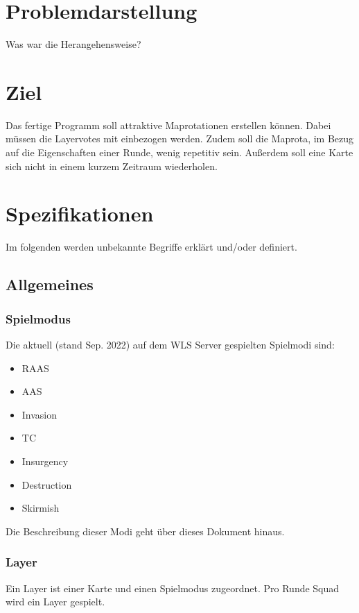 \documentclass[a4paper, 11pt]{scrartcl}
\begin{document}
    \section{Problemdarstellung}
        Was war die Herangehensweise?

    \section{Ziel}
        Das fertige Programm soll attraktive Maprotationen erstellen können.
        Dabei müssen die Layervotes mit einbezogen werden. Zudem soll die Maprota, im Bezug auf die Eigenschaften einer Runde, wenig repetitiv sein.
        Außerdem soll eine Karte sich nicht in einem kurzem Zeitraum wiederholen.

    \section{Spezifikationen}
    Im folgenden werden unbekannte Begriffe erklärt und/oder definiert.
        \subsection{Allgemeines}
            \subsubsection{Spielmodus}
                Die aktuell (stand Sep. 2022) auf dem {WLS} Server gespielten Spielmodi sind:\\
                \begin{itemize}
                    \item RAAS
                    \item AAS
                    \item Invasion
                    \item TC
                    \item Insurgency
                    \item Destruction
                    \item Skirmish
                \end{itemize}
                Die Beschreibung dieser Modi geht über dieses Dokument hinaus.
            \subsubsection{Layer}
                Ein Layer ist einer Karte und einen Spielmodus zugeordnet.
                Pro Runde Squad wird ein Layer gespielt. 
\end{document}
